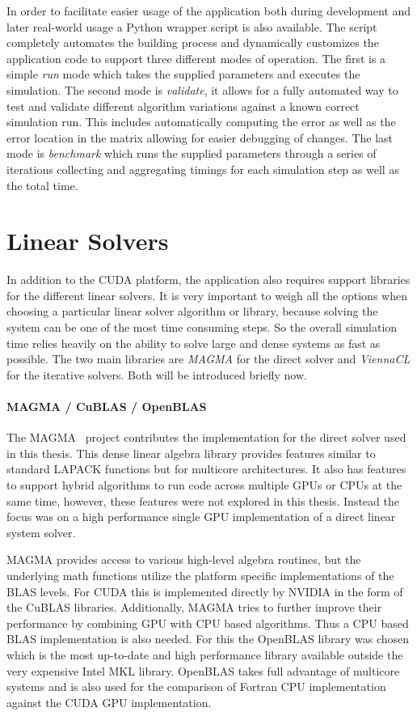 In order to facilitate easier usage of the application both during development and later real-world usage a Python wrapper script is also available. The script completely automates the building process and dynamically customizes the application code to support three different modes of operation. The first is a simple \emph{run} mode which takes the supplied parameters and executes the simulation. The second mode is \emph{validate}, it allows for a fully automated way to test and validate different algorithm variations against a known correct simulation run. This includes automatically computing the error as well as the error location in the matrix allowing for easier debugging of changes. The last mode is \emph{benchmark} which runs the supplied parameters through a series of iterations collecting and aggregating timings for each simulation step as well as the total time.

\section{Linear Solvers}
In addition to the CUDA platform, the application also requires support libraries for the different linear solvers. It is very important to weigh all the options when choosing a particular linear solver algorithm or library, because solving the system can be one of the most time consuming steps. So the overall simulation time relies heavily on the ability to solve large and dense systems as fast as possible. The two main libraries are \emph{MAGMA} for the direct solver and \emph{ViennaCL} for the iterative solvers. Both will be introduced briefly now.

\paragraph{MAGMA / CuBLAS / OpenBLAS}
The MAGMA~\cite{MagmaDocumentation} project contributes the implementation for the direct solver used in this thesis. This dense linear algebra library provides features similar to standard LAPACK functions but for multicore architectures. It also has features to support hybrid algorithms to run code across multiple GPUs or CPUs at the same time, however, these features were not explored in this thesis. Instead the focus was on a high performance single GPU implementation of a direct linear system solver.

MAGMA provides access to various high-level algebra routines, but the underlying math functions utilize the platform specific implementations of the BLAS levels. For CUDA this is implemented directly by NVIDIA in the form of the CuBLAS libraries. Additionally, MAGMA tries to further improve their performance by combining GPU with CPU based algorithms. Thus a CPU based BLAS implementation is also needed. For this the OpenBLAS library was chosen which is the most up-to-date and high performance library available outside the very expensive Intel MKL library. OpenBLAS takes full advantage of multicore systems and is also used for the comparison of Fortran CPU implementation against the CUDA GPU implementation.

